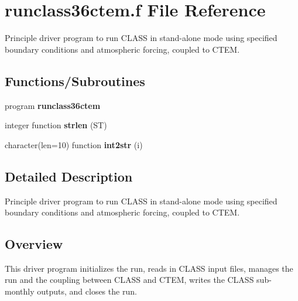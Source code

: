 \hypertarget{runclass36ctem_8f}{}\section{runclass36ctem.\+f File Reference}
\label{runclass36ctem_8f}


Principle driver program to run C\+L\+A\+S\+S in stand-\/alone mode using specified boundary conditions and atmospheric forcing, coupled to C\+T\+E\+M.  


\subsection*{Functions/\+Subroutines}
\begin{DoxyCompactItemize}
\item 
\hypertarget{runclass36ctem_8f_a6d56d6301df42923fa1e8aa2e6c02ec3}{}program {\bfseries runclass36ctem}\label{runclass36ctem_8f_a6d56d6301df42923fa1e8aa2e6c02ec3}

\item 
\hypertarget{runclass36ctem_8f_ae665ea752226de365786f295628b2f4f}{}integer function {\bfseries strlen} (S\+T)\label{runclass36ctem_8f_ae665ea752226de365786f295628b2f4f}

\item 
\hypertarget{runclass36ctem_8f_a1804a475192bb994b7e4be078687d902}{}character(len=10) function {\bfseries int2str} (i)\label{runclass36ctem_8f_a1804a475192bb994b7e4be078687d902}

\end{DoxyCompactItemize}


\subsection{Detailed Description}
Principle driver program to run C\+L\+A\+S\+S in stand-\/alone mode using specified boundary conditions and atmospheric forcing, coupled to C\+T\+E\+M. 

\subsection*{Overview}

This driver program initializes the run, reads in C\+L\+A\+S\+S input files, manages the run and the coupling between C\+L\+A\+S\+S and C\+T\+E\+M, writes the C\+L\+A\+S\+S sub-\/monthly outputs, and closes the run. 